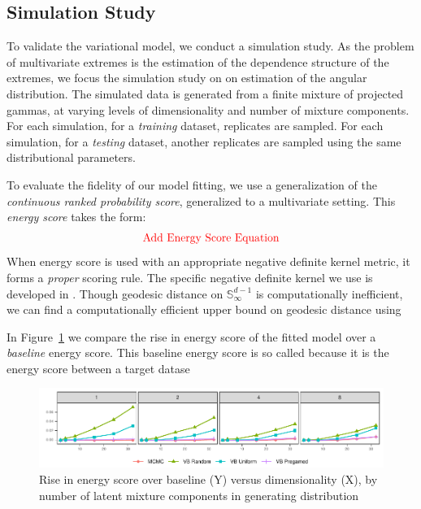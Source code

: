 \subsection{Simulation Study}
To validate the variational model, we conduct a simulation study.
    As the problem of multivariate extremes is the estimation of the dependence
    structure of the extremes, we focus the simulation study on on estimation of
    the angular distribution.  The simulated data is generated from a finite
    mixture of projected gammas, at varying levels of dimensionality and number
    of mixture components.  For each simulation, for a \emph{training} dataset,
     replicates are sampled.  For each simulation, for a 
    \emph{testing} dataset, another  replicates are sampled using
    the same distributional parameters.

To evaluate the fidelity of our model fitting, we use a generalization of the
    \emph{continuous ranked probability score}, generalized to a multivariate
    setting.  This \emph{energy score} \citep{gnieting2007} takes the form:
    \[
      \text{\textcolor{red}{Add Energy Score Equation}}  
    \]
    When energy score is used with an appropriate negative definite kernel 
    metric, it forms a \emph{proper} scoring rule. The specific negative 
    definite kernel we use is developed in \cite{trubey:pg}.   Though geodesic
    distance on $\mathbb{S}_{\infty}^{d-1}$ is computationally inefficient, we
    can find a computationally efficient upper bound on geodesic distance using
    
    
    In Figure~\ref{fig:energyscore} we 
    compare the rise in energy score of the fitted
    model over a \emph{baseline} energy score.  This baseline energy score is so
    called because it is the energy score between a target datase


\begin{figure}[ht]
    \caption{Rise in energy score over baseline (Y) versus dimensionality (X), 
            by number of latent mixture components in generating distribution
            \label{fig:energyscore}}
    \includegraphics{./plots/energy_score}
\end{figure}


